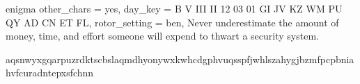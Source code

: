 \parindent0pt
 {enigma}
 {
  other_chars = yes,
  day_key = B V III II 12 03 01 GI JV KZ WM PU QY AD CN ET FL,
  rotor_setting = ben,
}
\startencryption
  Never underestimate the amount of money, time, and effort someone will expend to thwart a security system.
\stopencryption

\startdecryption
  aqsnwyxgqarpuzrdktscbslaqmdhyonywxkwhcdgphvuqsspfjwhlszahygjbzmfpcpbniahvfcuradntepxsfchnn
\stopdecryption
\bye
